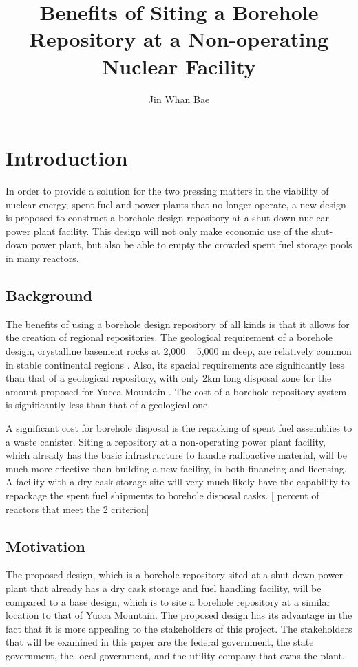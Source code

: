 \documentclass{anstrans}
\title{Benefits of Siting a Borehole Repository at a Non-operating Nuclear 
Facility}
\author{Jin Whan Bae }
\institute{
Dept. of Nuclear Plasma, and Radiological Engineering, University of Illinois at Urbana-Champaign
\and
Urbana, IL
}
\begin{document}
\section{Introduction}

In order to provide a solution for the two pressing matters in the viability of
nuclear energy, spent fuel and power plants that no longer operate, a new
design is proposed to construct a borehole-design repository at a shut-down
nuclear power plant facility. This design will not only make economic use of
the shut-down power plant, but also be able to empty the crowded spent fuel
storage pools in many reactors.



\subsection{Background}

The benefits of using a borehole design repository of all kinds is that it 
allows for the creation of regional repositories. The geological requirement of 
a borehole design, crystalline basement rocks at 2,000 ~ 5,000 m deep, are 
relatively common in stable continental regions \cite{arnold_research_2012}.  
Also, its spacial requirements are significantly less than that of a geological 
repository, with only 2km long disposal zone for the amount proposed for Yucca 
Mountain \cite{brady_deep_2009}. The cost of a borehole repository system is 
significantly less than that of a geological one. 

A significant cost for borehole disposal is the repacking of 
spent fuel assemblies to a waste canister. Siting a repository at a non-operating power 
plant facility, which already has the basic infrastructure to handle 
radioactive material, will be much more effective than building a new facility, 
in both financing and licensing. A facility with a dry cask storage site will very 
much likely have the capability to repackage the spent fuel shipments to 
borehole disposal casks. [ percent of reactors that meet the 2 criterion]

\subsection{Motivation}

The proposed design, which is a borehole repository sited at a shut-down power
plant that already has a dry cask storage and fuel handling facility, will be
 compared to a base design, which is to site a borehole repository 
at a similar location to that of Yucca Mountain. The proposed design has its 
advantage in the fact that it is more appealing to the stakeholders of this 
project. The stakeholders that will be examined in this paper are the federal 
government, the state government, the local government, and the utility company 
that owns the plant.
\end{document}
